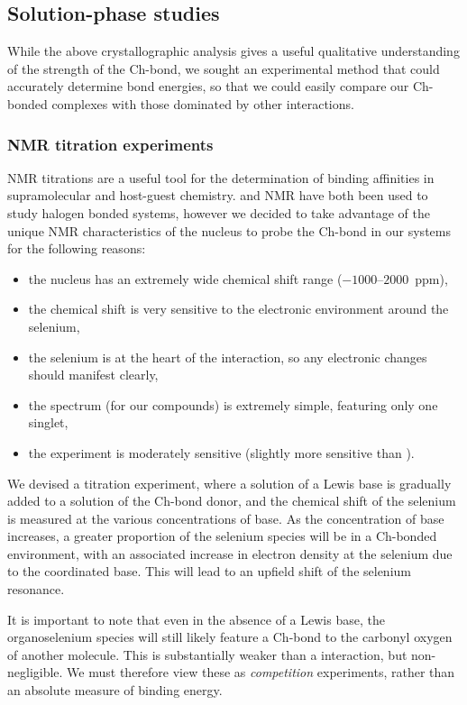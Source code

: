 \begin{refsection}
\subsection{Solution-phase studies}
While the above crystallographic analysis gives a useful qualitative understanding of the strength of the Ch-bond, we sought an experimental method that could accurately determine bond energies, so that we could easily compare our Ch-bonded complexes with those dominated by other interactions.

\subsubsection{NMR titration experiments}
NMR titrations are a useful tool for the determination of binding affinities in supra\-molecular and host-guest chemistry.\autocite{Foyle2020,Gilday2013,Garrett2015a,Sarwar2010}
 and  NMR have both been used to study halogen bonded systems, however we decided to take advantage of the unique NMR characteristics of the  nucleus to probe the Ch-bond in our systems for the following reasons:

\begin{itemize}
    \item the nucleus has an extremely wide chemical shift range ($-1000\text{--}2000$~ppm),
    \item the chemical shift is very sensitive to the electronic environment around the selenium,
    \item the selenium is at the heart of the interaction, so any electronic changes should manifest clearly,
    \item the spectrum (for our compounds) is extremely simple, featuring only one singlet,
    \item the experiment is moderately sensitive (slightly more sensitive than ).
\end{itemize}

We devised a titration experiment, where a solution of a Lewis base is gradually added to a solution of the Ch-bond donor, and the chemical shift of the selenium is measured at the various concentrations of base.
As the concentration of base increases, a greater proportion of the selenium species will be in a Ch-bonded environment, with an associated increase in electron density at the selenium due to the coordinated base.
This will lead to an upfield shift of the selenium resonance.

It is important to note that even in the absence of a Lewis base, the organoselenium species will still likely feature a Ch-bond to the carbonyl oxygen of another molecule.
This is substantially weaker than a  interaction, but non-negligible.
We must therefore view these as \emph{competition} experiments, rather than an absolute measure of binding energy.


\end{refsection}

